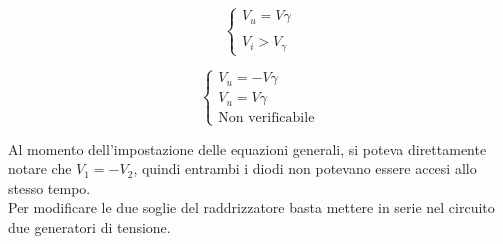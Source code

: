 \documentclass[../elettronica]{subfiles}
\begin{document}
\begin{minipage}[b]{.45\textwidth}
    \begin{tcolorbox}[title=D1 OFF e D2 ON]
        \[\begin{cases}
            V_u = V\gamma\\
            \\
            V_i > V_\gamma
        \end{cases}\]
    \end{tcolorbox}
\end{minipage}
\begin{minipage}[t]{.45\textwidth}
    \begin{tcolorbox}[title=D1 e D2 ON]
        \color{red}
        \[\begin{cases}
            V_u = -V\gamma\\
            V_u = V\gamma\\
            \text{Non verificabile}
        \end{cases}\]
    \end{tcolorbox}
\end{minipage}

\begin{figure}[h]
    \centering
    \begin{minipage}[b]{.45\textwidth}
    \end{minipage}
    \begin{minipage}[b]{.45\textwidth}
    \end{minipage}
\end{figure}
\noindent Al momento dell'impostazione delle equazioni generali, si poteva direttamente notare che $V_1 = -V_2$, quindi entrambi
i diodi non potevano essere accesi allo stesso tempo.
\\
Per modificare le due soglie del raddrizzatore basta mettere in serie nel circuito due generatori di tensione.
\end{document}
